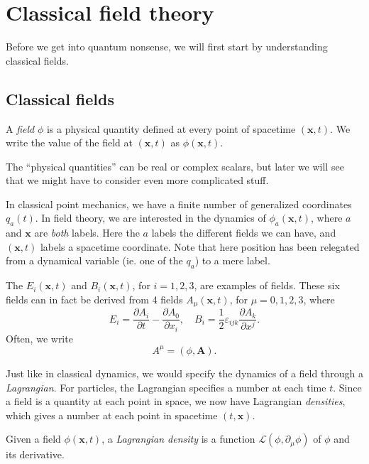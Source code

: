 \documentclass[a4paper]{article}
\begin{document}
\section{Classical field theory}
Before we get into quantum nonsense, we will first start by understanding classical fields.

\subsection{Classical fields}
\begin{defi}[Field]
  A \emph{field} $\phi$ is a physical quantity defined at every point of spacetime $(\mathbf{x}, t)$. We write the value of the field at $(\mathbf{x}, t)$ as $\phi(\mathbf{x}, t)$.
\end{defi}
The ``physical quantities'' can be real or complex scalars, but later we will see that we might have to consider even more complicated stuff.

In classical point mechanics, we have a finite number of generalized coordinates $q_a(t)$. In field theory, we are interested in the dynamics of $\phi_a(\mathbf{x}, t)$, where $a$ and $\mathbf{x}$ are \emph{both} labels. Here the $a$ labels the different fields we can have, and $(\mathbf{x}, t)$ labels a spacetime coordinate. Note that here position has been relegated from a dynamical variable (ie. one of the $q_a$) to a mere label.

\begin{eg}
  The  $E_i(\mathbf{x}, t)$ and  $B_i(\mathbf{x}, t)$, for $i = 1, 2, 3$, are examples of fields. These six fields can in fact be derived from 4 fields $A_\mu(\mathbf{x}, t)$, for $\mu = 0, 1, 2, 3$, where
  \[
    E_i = \frac{\partial A_i}{\partial t} - \frac{\partial A_0}{\partial x_i},\quad B_i = \frac{1}{2} \varepsilon_{ijk}\frac{\partial A_k}{\partial x^j}.
  \]
  Often, we write
  \[
    A^\mu = (\phi, \mathbf{A}).
  \]
\end{eg}

Just like in classical dynamics, we would specify the dynamics of a field through a \emph{Lagrangian}. For particles, the Lagrangian specifies a number at each time $t$. Since a field is a quantity at each point in space, we now have Lagrangian \emph{densities}, which gives a number at each point in spacetime $(t, \mathbf{x})$.

\begin{defi}
  Given a field $\phi (\mathbf{x}, t)$, a \emph{Lagrangian density} is a function $\mathcal{L}(\phi, \partial_\mu \phi)$ of $\phi$ and its derivative.
\end{defi}
\end{document}
